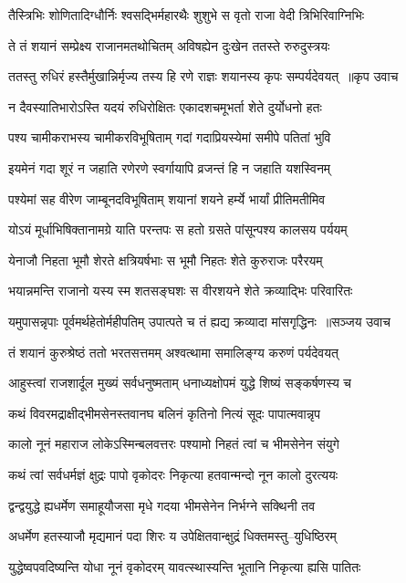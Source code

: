 \twolineshloka
{तैस्त्रिभिः शोणितादिग्धौर्निः श्वसद्भिर्महारथैः}
{शुशुभे स वृतो राजा वेदी त्रिभिरिवाग्निभिः}


\twolineshloka
{ते तं शयानं सम्प्रेक्ष्य राजानमतथोचितम्}
{अविषह्येन दुःखेन ततस्ते रुरुदुस्त्रयः}


\threelineshloka
{ततस्तु रुधिरं हस्तैर्मुखान्निर्मृज्य तस्य हि}
{रणे राज्ञः शयानस्य कृपः सम्पर्यदेवयत् ॥कृप उवाच}
{}


\twolineshloka
{न दैवस्यातिभारोऽस्ति यदयं रुधिरोक्षितः}
{एकादशचमूभर्ता शेते दुर्योधनो हतः}


\twolineshloka
{पश्य चामीकराभस्य चामीकरविभूषिताम्}
{गदां गदाप्रियस्येमां समीपे पतितां भुवि}


\twolineshloka
{इयमेनं गदा शूरं न जहाति रणेरणे}
{स्वर्गायापि व्रजन्तं हि न जहाति यशस्विनम्}


\twolineshloka
{पश्येमां सह वीरेण जाम्बूनदविभूषिताम्}
{शयानां शयने हर्म्ये भार्यां प्रीतिमतीमिव}


\twolineshloka
{योऽयं मूर्धाभिषिक्तानामग्रे याति परन्तपः}
{स हतो ग्रसते पांसून्पश्य कालसय पर्ययम्}


\twolineshloka
{येनाजौ निहता भूमौ शेरते क्षत्रियर्षभाः}
{स भूमौ निहतः शेते कुरुराजः परैरयम्}


\twolineshloka
{भयान्नमन्ति राजानो यस्य स्म शतसङ्घशः}
{स वीरशयने शेते क्रव्याद्भिः परिवारितः}


\threelineshloka
{यमुपासन्नृपाः पूर्वमर्थहेतोर्महीपतिम्}
{उपात्पते च तं ह्यद्य क्रव्यादा मांसगृद्धिनः ॥सञ्जय उवाच}
{}


\twolineshloka
{तं शयानं कुरुश्रेष्ठं ततो भरतसत्तमम्}
{अश्वत्थामा समालिङ्ग्य करुणं पर्यदेवयत्}


\twolineshloka
{आहुस्त्वां राजशार्दूल मुख्यं सर्वधनुष्मताम्}
{धनाध्यक्षोपमं युद्धे शिष्यं सङ्कर्षणस्य च}


\twolineshloka
{कथं विवरमद्राक्षीद्भीमसेनस्तवानघ}
{बलिनं कृतिनो नित्यं सूदः पापात्मवान्नृप}


\twolineshloka
{कालो नूनं महाराज लोकेऽस्मिन्बलवत्तरः}
{पश्यामो निहतं त्वां च भीमसेनेन संयुगे}


\twolineshloka
{कथं त्वां सर्वधर्मज्ञं क्षुद्रः पापो वृकोदरः}
{निकृत्या हतवान्मन्दो नून कालो दुरत्ययः}


\twolineshloka
{द्वन्द्वयुद्धे ह्यधर्मेण समाहूयौजसा मृधे}
{गदया भीमसेनेन निर्भग्ने सक्थिनी तव}


\twolineshloka
{अधर्मेण हतस्याजौ मृद्यमानं पदा शिरः}
{य उपेक्षितवान्क्षुद्रं धिक्तमस्तु--युधिष्ठिरम्}


\twolineshloka
{युद्धेष्वपवदिष्यन्ति योधा नूनं वृकोदरम्}
{यावत्स्थास्यन्ति भूतानि निकृत्या ह्यसि पातितः}


